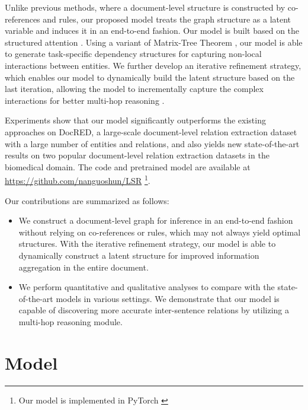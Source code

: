 \documentclass[11pt,a4paper]{article}
\begin{document}
Unlike previous methods, where a document-level structure is constructed by co-references and rules, our proposed model treats the graph structure as a latent variable and induces it in an end-to-end fashion. Our model is built based on the structured attention \citep{Kim2017StructuredAN, Liu2017LearningST}. Using a variant of Matrix-Tree Theorem \citep{tutte1984graph, Koo2007StructuredPM}, our model is able to generate task-specific dependency structures for capturing non-local interactions between entities. We further develop an iterative refinement strategy, which enables our model to dynamically build the latent structure based on the last iteration, allowing the model to incrementally capture the complex interactions for better multi-hop reasoning \cite{welbl2018constructing}.








Experiments show that our model significantly outperforms the existing approaches on DocRED, a large-scale document-level relation extraction dataset with a large number of entities and relations, and also yields new state-of-the-art results on two popular document-level relation extraction datasets in the biomedical domain. The code and pretrained model are available at \url{https://github.com/nanguoshun/LSR} \footnote{Our model is implemented in PyTorch \citep{Paszke2017AutomaticDI}}.  

Our contributions are summarized as follows:
\begin{itemize}
\item We construct a document-level graph for inference in an end-to-end fashion without relying on co-references or rules, which may not always yield optimal structures. With the iterative refinement strategy, our model is able to dynamically construct a latent structure for improved information aggregation in the entire document.
\item We perform quantitative and qualitative analyses to compare with the state-of-the-art models in various settings. We demonstrate that our model is capable of discovering more accurate inter-sentence relations by utilizing a multi-hop reasoning module.
\end{itemize}





 \section{Model}
\label{sec:3}
\end{document}

